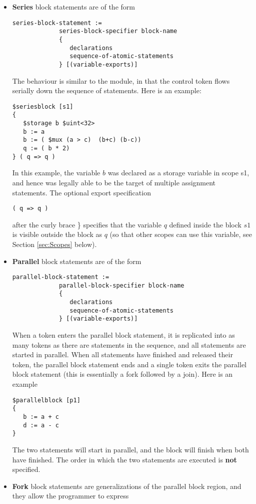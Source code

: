 \documentclass{article}
\begin{document}
\begin{itemize}
\item {\bf Series} block statements are of the form
\begin{verbatim}
series-block-statement :=
             series-block-specifier block-name
             { 
                declarations
                sequence-of-atomic-statements
             } [(variable-exports)]
\end{verbatim}
The behaviour is similar to the module, in that the control
token flows serially down the sequence of statements.
Here is an example:
\begin{verbatim}
$seriesblock [s1] 
{
   $storage b $uint<32>
   b := a
   b := ( $mux (a > c)  (b+c) (b-c))
   q := ( b * 2)
} ( q => q )
\end{verbatim}
In this example, the variable $b$ was declared as
a storage variable in scope s1, and hence was legally
able to be the target of multiple assignment statements.
The optional export specification
\begin{verbatim}
( q => q )
\end{verbatim}
after the curly brace \} specifies that the variable
$q$ defined inside the block $s1$ is visible outside
the block as $q$ (so that other scopes can use this
variable, see Section \ref{sec:Scopes} below).
\item {\bf Parallel} block statements are of the form
\begin{verbatim}
parallel-block-statement :=
             parallel-block-specifier block-name
             { 
                declarations
                sequence-of-atomic-statements
             } [(variable-exports)]
\end{verbatim}
When a token enters the parallel block statement, it
is replicated into as many tokens as there are statements in
the sequence, and all statements are started in parallel.
When all statements have finished and released their token,
the parallel block statement
ends and a single token exits the parallel block statement (this
is essentially a fork followed by a join).
Here is an example
\begin{verbatim}
$parallelblock [p1] 
{
   b := a + c
   d := a - c
}
\end{verbatim} %
The two statements will start in parallel, and the block 
will finish when both have finished.  The
order in which the two statements are executed
is {\bf not} specified.
\item {\bf Fork} block statements are generalizations of the
parallel block region, and they allow the programmer to express 

\end{itemize}
\end{document}
